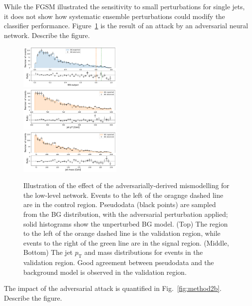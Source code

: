 \documentclass[reprint,nofootinbib,...]{revtex4-1}
\newcommand{\pt}{p_\mathrm{T}} %
\begin{document}
While the FGSM illustrated the sensitivity to small perturbations for single jets, it does not show how systematic ensemble perturbations could modify the classifier performance.  Figure~\ref{fig:method2} is the result of an attack by an adversarial neural network.  Describe the figure. 

\begin{figure}[h!]
\centering
\includegraphics[width=0.45\textwidth]{figures/pseudodata_NN_PFN.pdf} \\
\includegraphics[width=0.45\textwidth]{figures/pseudodata_pt_PFN.pdf} \\
\includegraphics[width=0.45\textwidth]{figures/pseudodata_mass_PFN.pdf} 
\caption{Illustration of the effect of the adversarially-derived mismodelling for the low-level network.
Events to the left of the oragnge dashed line are in the control region.
Pseudodata (black points) are sampled from the BG distribution, with the adversarial perturbation applied; solid histograms show the unperturbed BG model.
(Top) The region to the left of the orange dashed line is the validation region, while events to the right of the green line are in the signal region.
(Middle, Bottom) The jet $\pt$ and mass distributions for events in the validation region.
Good agreement between pseudodata and the background model is observed in the validation region.
}
\label{fig:method2}
\end{figure}

The impact of the adversarial attack is quantified in Fig.~\ref{fig:method2b}.  Describe the figure. 
\end{document}
